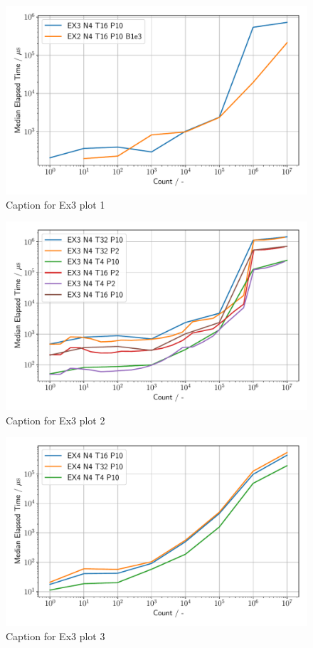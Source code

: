 \begin{figure}[h]
    \begin{center}
        \includegraphics[width=1.0\linewidth]{figures/Ex3_1.pdf}
        \caption{Caption for Ex3 plot 1}
        \label{Ex3_1_p}
    \end{center}
\end{figure}

\begin{figure}[h]
    \begin{center}
        \includegraphics[width=1.0\linewidth]{figures/Ex3_2.pdf}
        \caption{Caption for Ex3 plot 2}
        \label{Ex3_2_p}
    \end{center}
\end{figure}

\begin{figure}[h]
    \begin{center}
        \includegraphics[width=1.0\linewidth]{figures/Ex3_3.pdf}
        \caption{Caption for Ex3 plot 3}
        \label{Ex3_3_p}
    \end{center}
\end{figure}